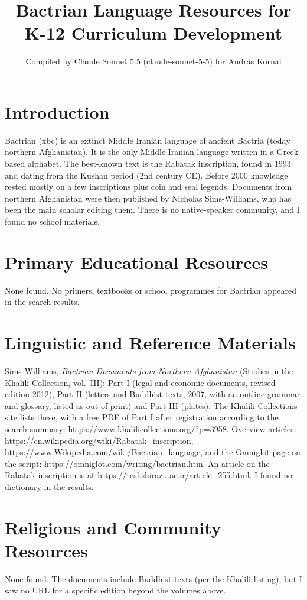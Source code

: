 \documentclass[12pt]{article}
\title{Bactrian Language Resources for K-12 Curriculum Development}
\author{Compiled by Claude Sonnet 5.5 (claude-sonnet-5-5) for Andr\'as Kornai}
\date{}
\begin{document}
\maketitle

\section{Introduction}
Bactrian (xbc) is an extinct Middle Iranian language of ancient Bactria (today northern Afghanistan). It is the only Middle Iranian language written in a Greek-based alphabet. The best-known text is the Rabatak inscription, found in 1993 and dating from the Kushan period (2nd century CE). Before 2000 knowledge rested mostly on a few inscriptions plus coin and seal legends. Documents from northern Afghanistan were then published by Nicholas Sims-Williams, who has been the main scholar editing them. There is no native-speaker community, and I found no school materials.

\section{Primary Educational Resources}
None found. No primers, textbooks or school programmes for Bactrian appeared in the search results.

\section{Linguistic and Reference Materials}
Sims-Williams, \emph{Bactrian Documents from Northern Afghanistan} (Studies in the Khalili Collection, vol.\ III): Part I (legal and economic documents, revised edition 2012), Part II (letters and Buddhist texts, 2007, with an outline grammar and glossary, listed as out of print) and Part III (plates). The Khalili Collections site lists these, with a free PDF of Part I after registration according to the search summary: \url{https://www.khalilicollections.org/?p=3958}. Overview articles: \url{https://en.wikipedia.org/wiki/Rabatak_inscription}, \url{https://www.Wikipedia.com/wiki/Bactrian_language}, and the Omniglot page on the script: \url{https://omniglot.com/writing/bactrian.htm}. An article on the Rabatak inscription is at \url{https://tesl.shirazu.ac.ir/article_255.html}. I found no dictionary in the results.

\section{Religious and Community Resources}
None found. The documents include Buddhist texts (per the Khalili listing), but I saw no URL for a specific edition beyond the volumes above.
\end{document}

